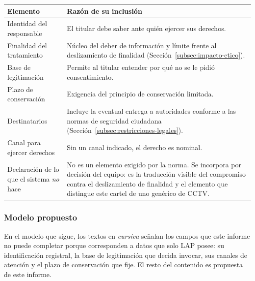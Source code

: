 \begin{center}
\small
\begin{tabularx}{\linewidth}{@{}L{4.2cm}Y@{}}
\toprule
\textbf{Elemento} & \textbf{Razón de su inclusión} \\
\midrule
Identidad del responsable &
El titular debe saber ante quién ejercer sus derechos. \\
\addlinespace
Finalidad del tratamiento &
Núcleo del deber de información y límite frente al deslizamiento de
finalidad (Sección~\ref{subsec:impacto-etico}). \\
\addlinespace
Base de legitimación &
Permite al titular entender por qué no se le pidió consentimiento. \\
\addlinespace
Plazo de conservación &
Exigencia del principio de conservación limitada. \\
\addlinespace
Destinatarios &
Incluye la eventual entrega a autoridades conforme a las normas de
seguridad ciudadana (Sección~\ref{subsec:restricciones-legales}). \\
\addlinespace
Canal para ejercer derechos &
Sin un canal indicado, el derecho es nominal. \\
\addlinespace
Declaración de lo que el sistema \emph{no} hace &
No es un elemento exigido por la norma. Se incorpora por decisión del equipo: es la traducción visible del compromiso contra el
deslizamiento de finalidad y el elemento que distingue este cartel de
uno genérico de CCTV. \\
\bottomrule
\end{tabularx}
\end{center}

\subsubsection{Modelo propuesto}

En el modelo que sigue, los textos en \emph{cursiva} señalan los campos
que este informe no puede completar porque corresponden a datos que solo
LAP posee: su identificación registral, la base de legitimación que
decida invocar, sus canales de atención y el plazo de conservación que
fije. El resto del contenido es propuesta de este informe.

